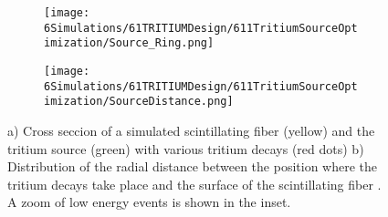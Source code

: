 \begin{figure}
\centering
    \begin{subfigure}[b]{0.45\textwidth}
    \centering
    \texttt{[image: 6Simulations/61TRITIUMDesign/611TritiumSourceOptimization/Source\_Ring.png]}  
    \caption{\label{subfig:TransversalCutTritiumSource}}
    \end{subfigure}
    \hfill
    \begin{subfigure}[b]{0.45\textwidth}
    \centering
    \texttt{[image: 6Simulations/61TRITIUMDesign/611TritiumSourceOptimization/SourceDistance.png]}  
    \caption{\label{subfig:DistanceDistributionTritiumSourceFiber}}
    \end{subfigure}
 \caption{a) Cross seccion of a simulated scintillating fiber (yellow) and the tritium source (green) with various tritium decays (red dots) b) Distribution of the radial distance between the position where the tritium decays take place and the surface of the scintillating fiber \cite{SimulationPaperCarlos}. A zoom of low energy events is shown in the inset.}
 \label{fig:TritiumSourceSimulated}
\end{figure}	

